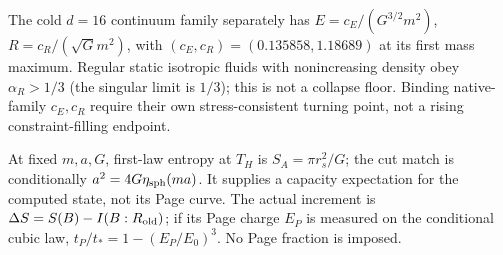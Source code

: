 The cold $d=16$ continuum family separately has
$E=c_E/(G^{3/2}m^2)$, $R=c_R/(\sqrt Gm^2)$, with
$(c_E,c_R)=(0.135858,1.18689)$ at its first mass maximum.
Regular static isotropic fluids with nonincreasing density obey
$\alpha_R>1/3$ (the singular limit is $1/3$); this is not a collapse
floor. Binding native-family $c_E,c_R$ require their own stress-consistent
turning point, not a rising constraint-filling endpoint.

At fixed $m,a,G$, first-law entropy at $T_H$ is $S_A=\pi r_s^2/G$;
the cut match is conditionally $a^2=4G\eta_{\rm sph}(ma)$.
It supplies a capacity expectation for the computed state, not its Page
curve. The actual increment is $\Delta S=S(B)-I(B:R_{\rm old})$;
if its Page charge $E_P$ is measured on the conditional cubic law,
$t_P/t_*=1-(E_P/E_0)^3$. No Page fraction is imposed.

